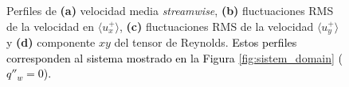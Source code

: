 \newpage

\begin{figure}[H]
 \centering
    
 \caption{Perfiles de \textbf{(a)} velocidad media \textit{streamwise}, \textbf{(b)} fluctuaciones RMS de la velocidad en $\langle u^+_x \rangle$, \textbf{(c)} fluctuaciones RMS de la velocidad $\langle u^+_y \rangle$ y \textbf{(d)} componente $xy$ del tensor de Reynolds. \textcolor{black}{Estos perfiles corresponden al sistema mostrado en la Figura \ref{fig:sistem_domain} ($q''_w=0$).}} 
 \label{fig:kim_1}
\end{figure}

